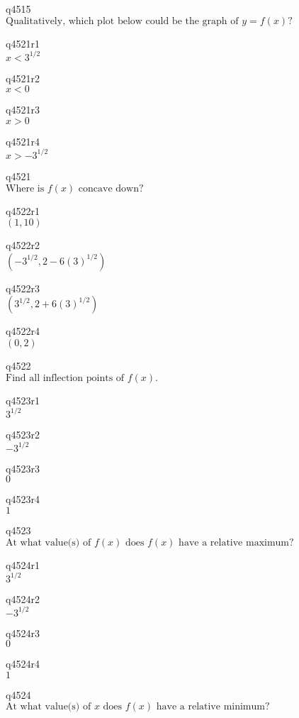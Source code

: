 q4515\\
\(\displaystyle \text{Qualitatively, which plot below could be the graph of } y = f(x)? \)

q4521r1\\
\(\displaystyle x < 3^{1/2} \)

q4521r2\\
\(\displaystyle x < 0 \)

q4521r3\\
\(\displaystyle x > 0 \)

q4521r4\\
\(\displaystyle x > -3^{1/2} \)

q4521\\
\(\displaystyle \text{Where is } f(x) \text{ concave down?} \)

q4522r1\\
\(\displaystyle (1, 10) \)

q4522r2\\
\(\displaystyle (-3^{1/2}, 2 - 6(3)^{1/2}) \)

q4522r3\\
\(\displaystyle (3^{1/2}, 2 + 6(3)^{1/2}) \)

q4522r4\\
\(\displaystyle (0, 2) \)

q4522\\
\(\displaystyle \text{Find all inflection points of } f(x). \)

q4523r1\\
\(\displaystyle 3^{1/2} \)

q4523r2\\
\(\displaystyle -3^{1/2} \)

q4523r3\\
\(\displaystyle 0 \)

q4523r4\\
\(\displaystyle 1 \)

q4523\\
\(\displaystyle \text{At what value(s) of } f(x) \text{ does } f(x) \text{ have a relative maximum?} \)

q4524r1\\
\(\displaystyle 3^{1/2} \)

q4524r2\\
\(\displaystyle -3^{1/2} \)

q4524r3\\
\(\displaystyle 0 \)

q4524r4\\
\(\displaystyle 1 \)

q4524\\
\(\displaystyle \text{At what value(s) of } x \text{ does } f(x) \text{ have a relative minimum?} \)

